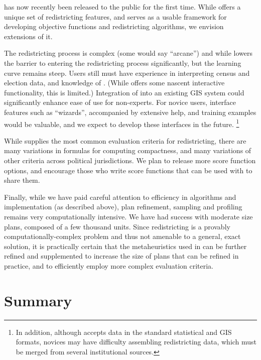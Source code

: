 \documentclass[article]{JSSstyle/jss}
\begin{document}
 has now recently been released to the public for the first time.  While  offers 
a unique set of redistricting features, and serves as a usable framework for developing objective functions and redistricting algorithms, we envision extensions of it.

The redistricting process is complex (some would say ``arcane'') and 
while  lowers the barrier to entering the redistricting process significantly, but the learning curve remains steep. Users still must have experience in interpreting census and election data, and knowledge of . (While  offers some nascent interactive functionality, this is limited.)  Integration of  into an existing GIS system could significantly enhance ease of use for non-experts. For novice users, interface features such as ``wizards'', accompanied by extensive help, and training 
examples would be valuable, and we expect to develop these interfaces in the future. \footnote{In addition, although  
accepts data in the standard statistical and GIS formats, novices may have difficulty assembling redistricting 
data, which must be merged from several institutional sources.} 

While  supplies the most common evaluation criteria for redistricting, there are 
many variations in formulas for computing compactness, and many variations of other criteria across political 
jurisdictions. We plan to release more score function options, and encourage those who write score 
functions that can be used with  to share them.

Finally, while we have paid careful attention to efficiency in algorithms and 
implementation (as described above), plan refinement, sampling and profiling remains very 
computationally intensive. We have had success with moderate size plans, composed of a few 
thousand units. Since redistricting is a provably computationally-complex problem and thus not 
amenable to a general, exact solution, it is practically certain that the metaheuristics 
used in  can be further refined and supplemented to increase the size of plans that can be refined in practice, and to efficiently employ more complex evaluation criteria.

\section{Summary}
\end{document}
